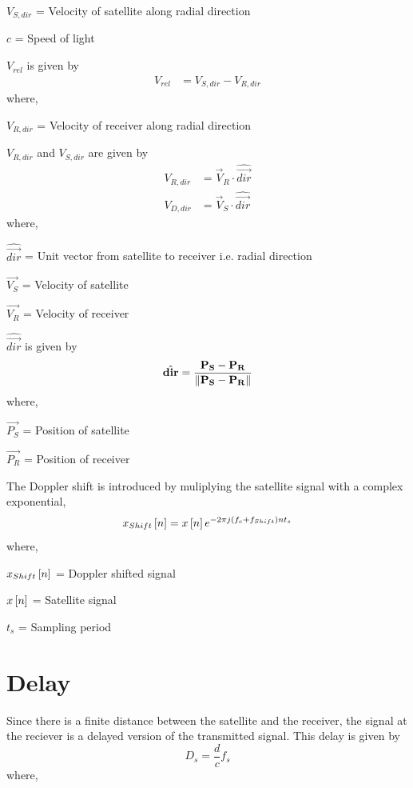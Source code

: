 \documentclass[11pt]{book}
\begin{document}
$V_{S,dir}$ = Velocity of satellite along radial direction

$c$ = Speed of light

$V_{rel}$ is given by
\begin{align}
    V_{rel} &= V_{S,dir} - V_{R,dir}
\end{align}
where,

$V_{R,dir}$ = Velocity of receiver along radial direction

$V_{R,dir}$ and $V_{S,dir}$ are given by
\begin{align}
    V_{R,dir} &= \vec{V}_{R} \cdot \hat{\vec{dir}}\\
    V_{D,dir} &= \vec{V}_{S} \cdot \hat{\vec{dir}}
\end{align}
where,

$\hat{\vec{dir}}$ = Unit vector from satellite to receiver i.e. radial direction

$\vec{V_{S}}$ = Velocity of satellite

$\vec{V_{R}}$ = Velocity of receiver

$\hat{\vec{dir}}$ is given by
\begin{align}
    \hat{\mathbf{dir}} = \frac{\mathbf{P_{S}}-\mathbf{P_{R}}}{\left\lVert\mathbf{P_{S}}-\mathbf{P_{R}}\right\rVert}
\end{align}
where,

$\vec{P_{S}}$ = Position of satellite

$\vec{P_{R}}$ = Position of receiver


The Doppler shift is introduced by muliplying the satellite signal with a complex exponential,
\begin{equation}
    x_{Shift}{}\left[n\right] = x{}\left[n\right]e^{-2 \pi j \left(f_{c}+f_{Shift}\right) n t_{s}}
\end{equation}
where,

$x_{Shift}{}\left[n\right]$ = Doppler shifted signal

$x{}\left[n\right]$ = Satellite signal

$t_{s}$ = Sampling period

\section{Delay}
Since there is a finite distance between the satellite and the receiver, the signal at the reciever is a delayed version of the transmitted signal. This delay is given by
\begin{equation}
    D_{s} = \frac{d}{c}f_{s} 
\end{equation}
where,
\end{document}
